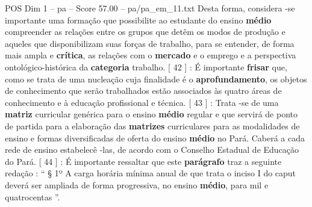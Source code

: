 \begin{textsample}{POS Dim 1 – pa – Score 57.00 – pa/pa\_em\_11.txt}
Desta forma, considera -se importante uma formação que possibilite ao estudante do ensino \textbf{médio} compreender as relações entre os grupos que detêm os modos de produção e aqueles que disponibilizam suas forças de trabalho, para se entender, de forma mais ampla e \textbf{crítica}, as relações com o \textbf{mercado} e o emprego e a perspectiva ontológico-histórica da \textbf{categoria} trabalho. [ 42 ] : É importante \textbf{frisar} que, como se trata de uma nucleação cuja finalidade é o \textbf{aprofundamento}, os objetos de conhecimento que serão trabalhados estão associados às quatro áreas de conhecimento e à educação profissional e técnica. [ 43 ] : Trata -se de uma \textbf{matriz} curricular genérica para o ensino \textbf{médio} regular e que servirá de ponto de partida para a elaboração das \textbf{matrizes} curriculares para as modalidades de ensino e formas diversificadas de oferta do ensino \textbf{médio} no Pará.
Caberá a cada rede de ensino estabelecê -las, de acordo com o Conselho Estadual de Educação do Pará. [ 44 ] : É importante ressaltar que este \textbf{parágrafo} traz a seguinte redação : “ § 1º A carga horária mínima anual de que trata o inciso I do caput deverá ser ampliada de forma progressiva, no ensino \textbf{médio}, para mil e quatrocentas ”.

\end{textsample}
